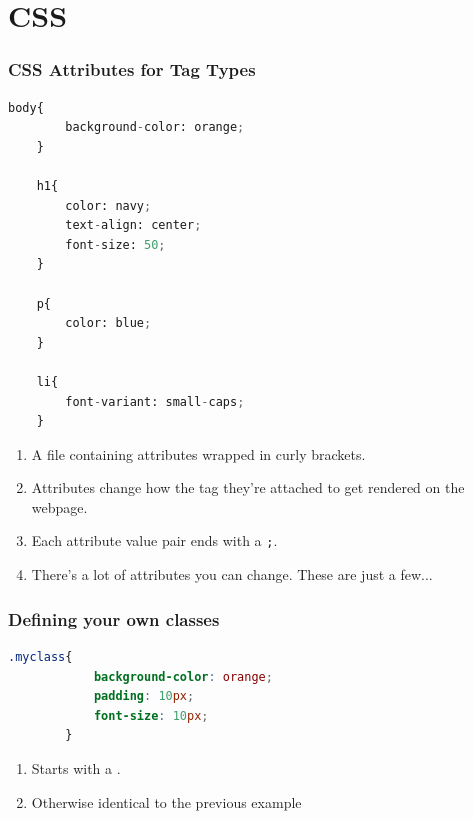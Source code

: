 \documentclass{beamer}
\begin{document}
\section{CSS}
%
%
\begin{frame}[fragile]
    \frametitle{CSS Attributes for Tag Types}
    \begin{minipage}{0.44\textwidth}
        \begin{lstlisting}[language=python, basicstyle=\scriptsize, autogobble]
    body{
        background-color: orange;
    }

    h1{
        color: navy;
        text-align: center;
        font-size: 50;
    }

    p{
        color: blue;
    }

    li{
        font-variant: small-caps;
    }
        \end{lstlisting} 
    \end{minipage}
    \hfill
    \begin{minipage}{0.44\textwidth}
        {\footnotesize
        \begin{enumerate}[A]
            \item A file containing attributes wrapped in curly brackets.
            \item Attributes change how the tag they're attached to get rendered on the webpage.
            \item Each attribute value pair ends with a \lstinline|;|.
            \item There's a lot of attributes you can change. These are just a few...
        \end{enumerate}}
    \end{minipage}
\end{frame}

%
%
\begin{frame}[fragile]
    \frametitle{Defining your own classes}
    \begin{minipage}{0.44\textwidth}
        \begin{lstlisting}[language=css, basicstyle=\scriptsize, autogobble]
        .myclass{
            background-color: orange;
            padding: 10px;
            font-size: 10px;
        }
        \end{lstlisting} 
    \end{minipage}
    \hfill
    \begin{minipage}{0.44\textwidth}
        \begin{enumerate}[A]
            \item Starts with a .
            \item Otherwise identical to the previous example
        \end{enumerate}
    \end{minipage}
\end{frame}
\end{document}
